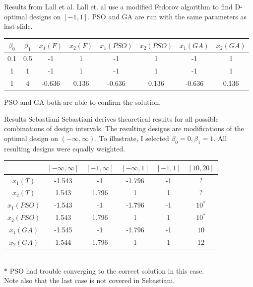 \documentclass[11pt]{beamer}
\begin{document}
\begin{frame}{Results from Lall et al.}
Lall et. al use a modified Fedorov algorithm to find D-optimal designs on $[-1,1]$. PSO and GA are run with the same parameters as last slide.
\begin{tabular}{|c|c|c|c|c|c|c|c|}
\hline 
 $\beta_0$ & $\beta_1$ & $x_1 (F)$ & $x_2 (F)$ & $x_1 (PSO)$ & $x_2 (PSO)$ & $x_1 (GA)$ & $x_2 (GA)$\\
\hline 
 0.1 & 0.5 & -1 & 1 & -1 & 1 & -1 & 1\\ 
\hline 
 1 & 1 & -1 & 1 & -1 & 1 & -1 & 1\\ 
\hline 
 1 & 4 & -0.636 & 0.136 & -0.636 & 0.136 & -0.636 & 0.136\\ 
\hline 
\end{tabular}
PSO and GA both are able to confirm the solution.
\end{frame}

\begin{frame}{Results Sebastiani}
Sebastiani derives theoretical results for all possible combinations of design intervals. The resulting designs are modifications of the optimal design on $(-\infty, \infty)$. To illustrate, I selected $\beta_0 = 0, \beta_1=1$. All resulting designs were equally weighted.

\begin{tabular}{|c|c|c|c|c|c|}
\hline 
  & $[-\infty, \infty]$  & $[-1, \infty]$ & $[-\infty,1]$ & $[-1,1]$ & $[10, 20]$\\ 
\hline 
$x_1 (T)$ & -1.543 & -1 & -1.796 & -1  & ?\\ 
\hline 
$x_2 (T)$ & 1.543 & 1.796 & 1 & 1 & ?\\ 
\hline 
$x_1 (PSO)$ & -1.543 & -1 & -1.796 & -1 & $10^*$\\
\hline
$x_2 (PSO)$ & 1.543  & 1.796 & 1 & 1 & $10^*$\\
\hline
$x_1 (GA)$ & -1.545 & -1 & -1.796 & -1 & $10$\\
\hline
$x_2 (GA)$ & 1.544 & 1.796 & 1 & 1 & $12$\\
\hline
\end{tabular} \\
$*$ PSO had trouble converging to the correct solution in this case. \\Note also that the last case is not covered in Sebastiani.
\end{frame}
\end{document}
